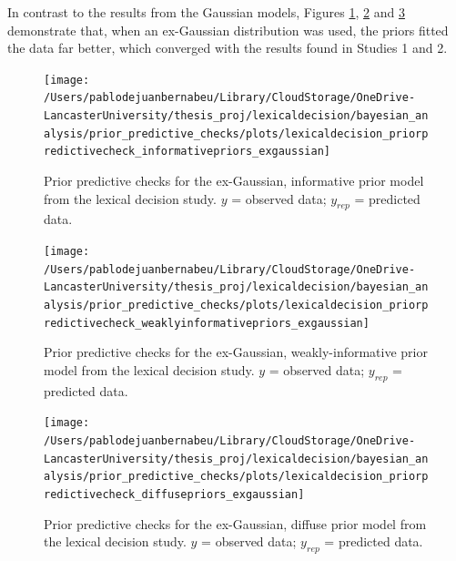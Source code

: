 \documentclass[
  12pt,
  man,floatsintext]{apa7}
\begin{document}
In contrast to the results from the Gaussian models, Figures \ref{fig:lexicaldecision-priorpredictivecheck-informativepriors-exgaussian}, \ref{fig:lexicaldecision-priorpredictivecheck-weaklyinformativepriors-exgaussian} and \ref{fig:lexicaldecision-priorpredictivecheck-diffusepriors-exgaussian} demonstrate that, when an ex-Gaussian distribution was used, the priors fitted the data far better, which converged with the results found in Studies 1 and 2.



\begin{figure}

{\centering \texttt{[image: /Users/pablodejuanbernabeu/Library/CloudStorage/OneDrive-LancasterUniversity/thesis\_proj/lexicaldecision/bayesian\_analysis/prior\_predictive\_checks/plots/lexicaldecision\_priorpredictivecheck\_informativepriors\_exgaussian]} 

}

\caption{Prior predictive checks for the ex-Gaussian, informative prior model from the lexical decision study. \(y\) = observed data; \(y_{rep}\) = predicted data.}\label{fig:lexicaldecision-priorpredictivecheck-informativepriors-exgaussian}
\end{figure}



\begin{figure}

{\centering \texttt{[image: /Users/pablodejuanbernabeu/Library/CloudStorage/OneDrive-LancasterUniversity/thesis\_proj/lexicaldecision/bayesian\_analysis/prior\_predictive\_checks/plots/lexicaldecision\_priorpredictivecheck\_weaklyinformativepriors\_exgaussian]} 

}

\caption{Prior predictive checks for the ex-Gaussian, weakly-informative prior model from the lexical decision study. \(y\) = observed data; \(y_{rep}\) = predicted data.}\label{fig:lexicaldecision-priorpredictivecheck-weaklyinformativepriors-exgaussian}
\end{figure}



\begin{figure}

{\centering \texttt{[image: /Users/pablodejuanbernabeu/Library/CloudStorage/OneDrive-LancasterUniversity/thesis\_proj/lexicaldecision/bayesian\_analysis/prior\_predictive\_checks/plots/lexicaldecision\_priorpredictivecheck\_diffusepriors\_exgaussian]} 

}

\caption{Prior predictive checks for the ex-Gaussian, diffuse prior model from the lexical decision study. \(y\) = observed data; \(y_{rep}\) = predicted data.}\label{fig:lexicaldecision-priorpredictivecheck-diffusepriors-exgaussian}
\end{figure}
\end{document}

